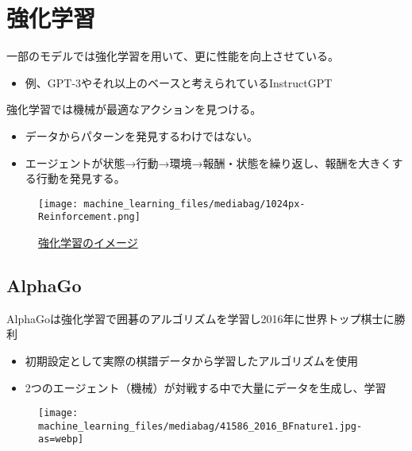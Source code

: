 \documentclass[
  xelatex,
  ja=standard]{bxjsarticle}
\providecommand{\tightlist}{%
  \setlength{\itemsep}{0pt}\setlength{\parskip}{0pt}}\usepackage{longtable,booktabs,array}
\begin{document}
\hypertarget{ux5f37ux5316ux5b66ux7fd2}{%
\section{強化学習}\label{ux5f37ux5316ux5b66ux7fd2}}

一部のモデルでは強化学習を用いて、更に性能を向上させている。

\begin{itemize}
\tightlist
\item
  例、GPT-3やそれ以上のベースと考えられているInstructGPT
\end{itemize}

強化学習では機械が最適なアクションを見つける。

\begin{itemize}
\tightlist
\item
  データからパターンを発見するわけではない。
\item
  エージェントが状態→行動→環境→報酬・状態を繰り返し、報酬を大きくする行動を発見する。
\end{itemize}

\begin{figure}[htpb]

{\centering \texttt{[image: machine\_learning\_files/mediabag/1024px-Reinforcement.png]}

}

\caption{\href{https://commons.wikimedia.org/wiki/File:Reinforcement_learning_diagram.svg}{強化学習のイメージ}}

\end{figure}

\hypertarget{alphago}{%
\subsection{AlphaGo}\label{alphago}}

AlphaGoは強化学習で囲碁のアルゴリズムを学習し2016年に世界トップ棋士に勝利

\begin{itemize}
\tightlist
\item
  初期設定として実際の棋譜データから学習したアルゴリズムを使用
\item
  2つのエージェント（機械）が対戦する中で大量にデータを生成し、学習
\end{itemize}

\begin{figure}[htpb]

{\centering \texttt{[image: machine\_learning\_files/mediabag/41586\_2016\_BFnature1.jpg-as=webp]}

}

\caption{\citet{silver2016}}

\end{figure}
\end{document}
